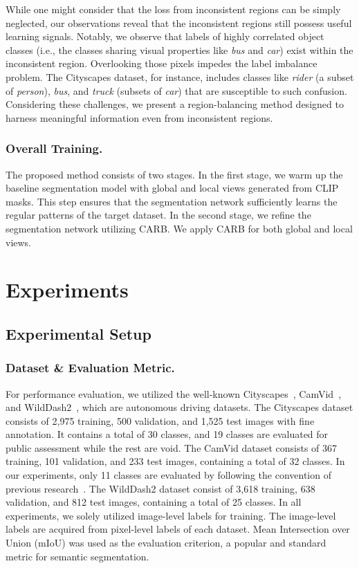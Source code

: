 \documentclass[letterpaper]{article} %
\def\ie{i.e.} \def\Ie{I.e.}
\begin{document}
While one might consider that the loss from inconsistent regions can be simply neglected, our observations reveal that the inconsistent regions still possess useful learning signals. Notably, we observe that labels of highly correlated object classes (\ie, the classes sharing visual properties like \textit{bus} and \textit{car}) exist within the inconsistent region. Overlooking those pixels impedes the label imbalance problem. The Cityscapes dataset, for instance, includes classes like \textit{rider} (a subset of \textit{person}), \textit{bus}, and \textit{truck} (subsets of \textit{car}) that are susceptible to such confusion. Considering these challenges, we present a region-balancing method designed to harness meaningful information even from inconsistent regions.

\subsubsection{Overall Training.}
The proposed method consists of two stages. In the first stage, we warm up the baseline segmentation model with global and local views generated from CLIP masks. This step ensures that the segmentation network sufficiently learns the regular patterns of the target dataset. In the second stage, we refine the segmentation network utilizing CARB. We apply CARB for both global and local views.

\section{Experiments}
\subsection{Experimental Setup}
\subsubsection{Dataset \& Evaluation Metric.} For performance evaluation, we utilized the well-known Cityscapes~\cite{cordts2016cityscapes}, CamVid~\cite{brostow2009semantic}, and WildDash2~\cite{Zendel_2022_CVPR}, which are autonomous driving datasets. The Cityscapes dataset consists of 2,975 training, 500 validation, and 1,525 test images with fine annotation. It contains a total of 30 classes, and 19 classes are evaluated for public assessment while the rest are void. The CamVid dataset consists of 367 training, 101 validation, and 233 test images, containing a total of 32 classes. In our experiments, only 11 classes are evaluated by following the convention of previous research~\cite{wang2020deep}. The WildDash2 dataset consist of 3,618 training, 638 validation, and 812 test images, containing a total of 25 classes. In all experiments, we solely utilized image-level labels for training. The image-level labels are acquired from pixel-level labels of each dataset. Mean Intersection over Union (mIoU) was used as the evaluation criterion, a popular and standard metric for semantic segmentation.
\end{document}
